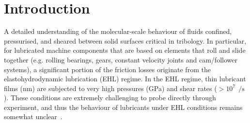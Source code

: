 \documentclass[5p]{elsarticle}
\begin{document}


\maketitle


\section{Introduction}

A detailed understanding of the molecular-scale behaviour of fluids confined, pressurised, and sheared between solid surfaces critical in tribology. In particular, for lubricated machine components that are based on elements that roll and slide together (e.g. rolling bearings, gears, constant velocity joints and cam/follower systems), a significant portion of the friction losses originate from the elastohydrodynamic lubrication (EHL) regime. In the EHL regime, thin lubricant films (nm) are subjected to very high pressures (GPa) and shear rates ($> 10^{7}~\SI{}{\per\second}$). These conditions are extremely challenging to probe directly through experiment, and thus the behaviour of lubricants under EHL conditions remains somewhat unclear~\cite{Spikes2014}.
\end{document}
